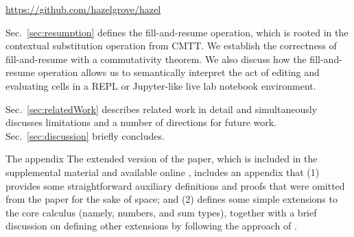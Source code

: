 \begin{center}
\url{https://github.com/hazelgrove/hazel}
\end{center}

Sec.~\ref{sec:resumption} defines the fill-and-resume operation, which is rooted in the contextual substitution operation from CMTT. We establish the correctness of fill-and-resume with a commutativity theorem. We also discuss how the fill-and-resume operation allows us to semantically interpret the act of editing and evaluating cells in a REPL or Jupyter-like live lab notebook environment.

Sec.~\ref{sec:relatedWork} describes related work in detail and simultaneously discusses limitations and a number of directions for future work. Sec.~\ref{sec:discussion} briefly concludes. 

\ifarxiv
The appendix 
\else
The extended version of the paper, which is included in the supplemental material and available online \cite{2018arXiv180500155O}, includes an appendix that 
\fi
(1) provides some straightforward auxiliary definitions and proofs that were omitted from the paper for the sake of space; and (2) defines some simple extensions to the core calculus (namely, numbers, and sum types), together with a brief discussion on  defining other extensions by following the approach of \citet{DBLP:conf/popl/CiminiS16}. 

